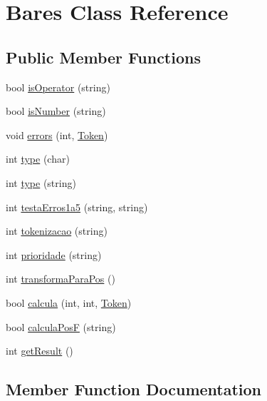 \hypertarget{classBares}{}\section{Bares Class Reference}
\label{classBares}
\subsection*{Public Member Functions}
\begin{DoxyCompactItemize}
\item 
bool \hyperlink{classBares_a7099edd8b6847c430a86b5ad8c8a67e8}{is\+Operator} (string)
\item 
bool \hyperlink{classBares_ac2c9417ba43ecbf6a1731e7b78f127e9}{is\+Number} (string)
\item 
void \hyperlink{classBares_a5fdb9605f566885b1bd624b76030babf}{errors} (int, \hyperlink{structToken}{Token})
\item 
int \hyperlink{classBares_aa31cf3da4e7e28ceb5da86e7118f30f6}{type} (char)
\item 
int \hyperlink{classBares_af362a384ef4500b25321b99f1e494e59}{type} (string)
\item 
int \hyperlink{classBares_a845256ca5c22ff7840f97a01650949c7}{testa\+Erros1a5} (string, string)
\item 
int \hyperlink{classBares_a0fec70452075bb8f1137b620ddb9c404}{tokenizacao} (string)
\item 
int \hyperlink{classBares_a76b64240266d8df966666db231ce50de}{prioridade} (string)
\item 
int \hyperlink{classBares_a3e756074dd60f5fae9b76a87bc71a854}{transforma\+Para\+Pos} ()
\item 
bool \hyperlink{classBares_a58727037a5fab7598830f0ec4d242d8c}{calcula} (int, int, \hyperlink{structToken}{Token})
\item 
bool \hyperlink{classBares_a404b6eb76c4370c660c57aedafcfe943}{calcula\+Pos\+F} (string)
\item 
int \hyperlink{classBares_a017a532e599d739e926f81fa5678b965}{get\+Result} ()
\end{DoxyCompactItemize}


\subsection{Member Function Documentation}
\hypertarget{classBares_a58727037a5fab7598830f0ec4d242d8c}{}
